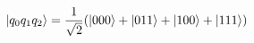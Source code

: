 \documentclass[preview]{standalone}
\begin{document}
\begin{align*}
\ket{q_0 q_1 q_2} =\frac{1}{\sqrt{2}}(\ket{000} + \ket{011}+\ket{100} +\ket{111})
\end{align*}
\end{document}
